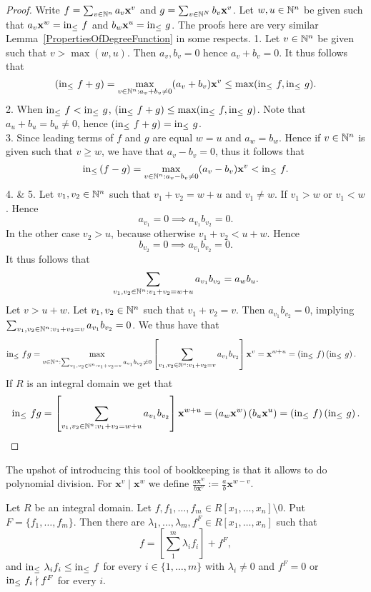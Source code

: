 \begin{proof}
    Write $f=\sum_{v\in\mathbb{N}^n} a_v\mathbf{x}^v$ and $g=\sum_{v\in \mathbb{N}^N} b_v\mathbf{x}^v$. Let $w,u\in \mathbb{N}^n$ be given such that $a_v\mathbf{x}^w = \mathrm{in}_\leq\ f$ and $b_w\mathbf{x}^u = \mathrm{in}_\leq\ g$. The proofs here are very similar Lemma~\ref{PropertiesOfDegreeFunction} in some respects.
    1. Let $v\in \mathbb{N}^n$ be given such that $v>\max(w,u)$. Then $a_v,b_v=0$ hence $a_v+b_v=0$. It thus follows that 
    $$\left(\mathrm{in}_\leq\ f+g\right) = \max_{v\in \mathbb{N}^n : a_v+b_v \neq 0} (a_v+b_v)\mathbf{x}^v \leq \max(\mathrm{in}_\leq\ f,\mathrm{in}_\leq\ g).$$
    2. When $\inn\ f < \inn\ g$, $\left(\inn\ f+g\right) \leq \max(\inn\ f,\inn\ g)$. Note that $a_u+b_u = b_u\neq 0$, hence $\left(\inn\ f + g\right) = \inn\ g$.\\
    3. Since leading terms of $f$ and $g$ are equal $w=u$ and $a_w = b_w$. Hence if $v\in \mathbb{N}^n$ is given such that $v\geq w$, we have that $a_v-b_v = 0$, thus it follows that 
    $$\inn\left(f-g\right) = \max_{v\in \N^n : a_v-b_v\neq 0} (a_v-b_v)\mathbf{x}^v< \inn\ f.$$
    4. \& 5.
    Let $v_1,v_2\in \mathbb{N}^n$ such that $v_1+v_2 = w+u $ and $v_1\neq w$. If $v_1>w$ or $v_1<w$. Hence 
    $$a_{v_1}=0\implies a_{v_1}b_{v_2}=0.$$
    In the other case $v_2>u$, because otherwise $v_1+v_2<u+w$. Hence $$b_{v_2}=0 \implies a_{v_1}b_{v_2}=0.$$
    It thus follows that 
    $$\sum_{v_1,v_2\in\mathbb{N}^n : v_1+v_2 = w+u} a_{v_1}b_{v_2}= a_wb_u.$$
    Let $v > u+w$. Let $v_1,v_2\in \mathbb{N}^n$ such that $v_1+v_2 = v$. Then $a_{v_1}b_{v_2} = 0$, implying $\sum_{v_1,v_2\in \mathbb{N}^n : v_1+v_2=v} a_{v_1}b_{v_2} = 0$. We thus have that 
    \begin{align*} 
        \inn\ fg &= \max_{v\in\N^n : \sum_{v_1,v_2\in\N^n : v_1+v_2=v} a_{v_1}b_{v_2}\neq 0} \left[\sum_{v_1,v_2\in \N^n : v_1+v_2 = v}a_{v_1}b_{v_2}\right]\mathbf{x}^v = \mathbf{x}^{w+u}=\left(\inn\ f\right) \left(\inn\ g\right).
    \end{align*}
    If $R$ is an integral domain we get that 
    $$\inn\ fg = \left[\sum_{v_1,v_2\in \N^n : v_1+v_2=w+u} a_{v_1}b_{v_2}\right]\mathbf{x}^{w+u} = \left(a_w\mathbf{x}^w\right)\left(b_u\mathbf{x}^u\right) =  \left(\inn\ f \right)\left( \inn\ g\right).$$
\end{proof}
The upshot of introducing this tool of bookkeeping is that it allows to do polynomial division. For $\mathbf{x}^v\mid \mathbf{x}^w$ we define $\frac{a\mathbf{x}^w}{b\mathbf{x}^v} := \frac{a}{b}\mathbf{x}^{w-v}$.
\begin{theorem}
    Let $R$ be an integral domain. Let $f,f_1,\dots,f_m\in R[x_1,\dots,x_n]\setminus 0$. Put $F= \{f_1,\dots,f_m\}$. Then there are $\lambda_1,\dots,\lambda_m, f^F\in R[x_1,\dots,x_n]$ such that 
    $$f = \left[\sum_1^m \lambda_if_i\right]+f^F,$$
    and $\mathrm{in}_\leq\ \lambda_if_i\leq \mathrm{in}_\leq\ f$ for every $i\in\{1,\dots,m\}$ with $\lambda_i\neq 0$ and $f^F = 0$ or $\mathrm{in}_\leq \ f_i\nmid f^F$ for every $i$.
\end{theorem}
